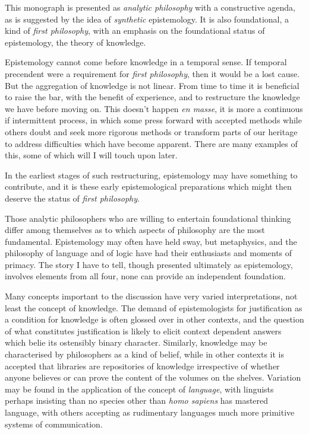 \documentclass[10pt,titlepage]{book}
\begin{document}
This monograph is presented as \emph{analytic philosophy} with a constructive agenda, as is suggested by the idea of \emph{synthetic} epistemology.
It is also foundational, a kind of \emph{first philosophy}, with an emphasis on the foundational status of epistemology, the theory of knowledge.


Epistemology cannot come before knowledge in a temporal sense.
If temporal precendent were a requirement for \emph{first philosophy}, then it would be a lost cause.
But the aggregation of knowledge is not linear.
From time to time it is beneficial to raise the bar, with the benefit of experience, and to restructure the knowledge we have before moving on.
This doesn't happen \emph{en masse}, it is more a continuous if intermittent process, in which some press forward with accepted methods while others doubt and seek more rigorous methods or transform parts of our heritage to address difficulties which have become apparent.
There are many examples of this, some of which will I will touch upon later.

In the earliest stages of such restructuring, epistemology may have something to contribute, and it is these early epistemological preparations which might then deserve the status of \emph{first philosophy}.

Those analytic philosophers who are willing to entertain foundational thinking differ among themselves as to which aspects of philosophy are the most fundamental.
Epistemology may often have held sway, but metaphysics, and the philosophy of language and of logic have had their enthusiasts and moments of primacy.
The story I have to tell, though presented ultimately as epistemology, involves elements from all four, none can provide an independent foundation.

Many concepts important to the discussion have very varied interpretations, not least the concept of knowledge.
The demand of epistemologists for justification as a condition for knowledge is often glossed over in other contexts, and the question of what constitutes justification is likely to elicit context dependent answers which belie its ostensibly binary character.
Similarly, knowledge may be characterised by philosophers as a kind of belief, while in other contexts it is accepted that libraries are repositories of knowledge irrespective of whether anyone believes or can prove the content of the volumes on the shelves.
Variation may be found in the application of the concept of \emph{language}, with linguists perhaps insisting than no species other than \emph{homo sapiens} has mastered language, with others accepting as rudimentary languages much more primitive systems of communication.
\end{document}
